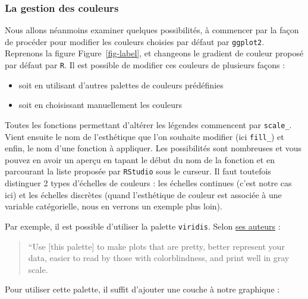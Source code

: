 \documentclass[
  a4paper,
  DIV=11,
  numbers=noendperiod,
  oneside]{scrreprt}
\providecommand{\tightlist}{%
  \setlength{\itemsep}{0pt}\setlength{\parskip}{0pt}}\usepackage{longtable,booktabs,array}
\begin{document}
\subsubsection{La gestion des couleurs}\label{la-gestion-des-couleurs}

Nous allons néanmoins examiner quelques possibilités, à commencer par la
façon de procéder pour modifier les couleurs choisies par défaut par
\texttt{ggplot2}. Reprenons la figure Figure~\ref{fig-label}, et
changeons le gradient de couleur proposé par défaut par \texttt{R}. Il
est possible de modifier ces couleurs de plusieurs façons :

\begin{itemize}
\tightlist
\item
  soit en utilisant d'autres palettes de couleurs prédéfinies
\item
  soit en choisissant manuellement les couleurs
\end{itemize}

Toutes les fonctions permettant d'altérer les légendes commencent par
\texttt{scale\_}. Vient ensuite le nom de l'esthétique que l'on souhaite
modifier (ici \texttt{fill\_}) et enfin, le nom d'une fonction à
appliquer. Les possibilités sont nombreuses et vous pouvez en avoir un
aperçu en tapant le début du nom de la fonction et en parcourant la
liste proposée par \texttt{RStudio} sous le curseur. Il faut toutefois
distinguer 2 types d'échelles de couleurs : les échelles continues
(c'est notre cas ici) et les échelles discrètes (quand l'esthétique de
couleur est associée à une variable catégorielle, nous en verrons un
exemple plus loin).

Par exemple, il est possible d'utiliser la palette \texttt{viridis}.
Selon
\href{https://cran.r-project.org/web/packages/viridis/vignettes/intro-to-viridis.html}{ses
auteurs} :

\begin{quote}
``Use {[}this palette{]} to make plots that are pretty, better represent
your data, easier to read by those with colorblindness, and print well
in gray scale.
\end{quote}

Pour utiliser cette palette, il suffit d'ajouter une couche à notre
graphique :
\end{document}
